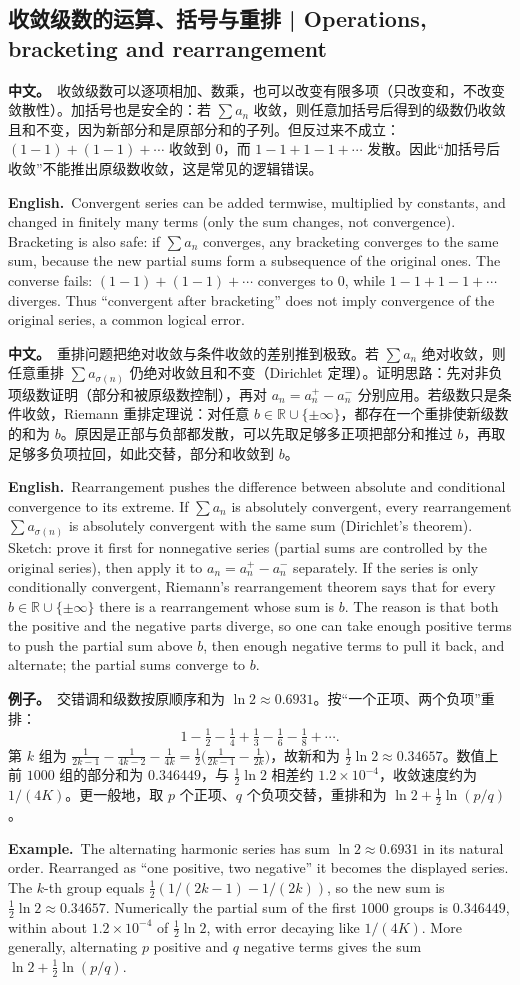 \documentclass[UTF8,11pt,a4paper]{ctexart}
\newcommand{\BOTH}[2]{\par\noindent\textbf{中文。}\ #1\par\noindent\textbf{English.}\ #2\par}
\newcommand{\EX}[2]{\par\noindent\textbf{例子。}\ #1\par\noindent\textbf{Example.}\ #2\par}
\begin{document}
\subsection{收敛级数的运算、括号与重排 | Operations, bracketing and rearrangement}
\BOTH{收敛级数可以逐项相加、数乘，也可以改变有限多项（只改变和，不改变敛散性）。加括号也是安全的：若 $\sum a_n$ 收敛，则任意加括号后得到的级数仍收敛且和不变，因为新部分和是原部分和的子列。但反过来不成立：$(1-1)+(1-1)+\cdots$ 收敛到 $0$，而 $1-1+1-1+\cdots$ 发散。因此“加括号后收敛”不能推出原级数收敛，这是常见的逻辑错误。}{Convergent series can be added termwise, multiplied by constants, and changed in finitely many terms (only the sum changes, not convergence). Bracketing is also safe: if $\sum a_n$ converges, any bracketing converges to the same sum, because the new partial sums form a subsequence of the original ones. The converse fails: $(1-1)+(1-1)+\cdots$ converges to $0$, while $1-1+1-1+\cdots$ diverges. Thus “convergent after bracketing” does not imply convergence of the original series, a common logical error.}
\BOTH{重排问题把绝对收敛与条件收敛的差别推到极致。若 $\sum a_n$ 绝对收敛，则任意重排 $\sum a_{\sigma(n)}$ 仍绝对收敛且和不变（Dirichlet 定理）。证明思路：先对非负项级数证明（部分和被原级数控制），再对 $a_n=a_n^+-a_n^-$ 分别应用。若级数只是条件收敛，Riemann 重排定理说：对任意 $b\in\mathbb R\cup\{\pm\infty\}$，都存在一个重排使新级数的和为 $b$。原因是正部与负部都发散，可以先取足够多正项把部分和推过 $b$，再取足够多负项拉回，如此交替，部分和收敛到 $b$。}{Rearrangement pushes the difference between absolute and conditional convergence to its extreme. If $\sum a_n$ is absolutely convergent, every rearrangement $\sum a_{\sigma(n)}$ is absolutely convergent with the same sum (Dirichlet's theorem). Sketch: prove it first for nonnegative series (partial sums are controlled by the original series), then apply it to $a_n=a_n^+-a_n^-$ separately. If the series is only conditionally convergent, Riemann's rearrangement theorem says that for every $b\in\mathbb R\cup\{\pm\infty\}$ there is a rearrangement whose sum is $b$. The reason is that both the positive and the negative parts diverge, so one can take enough positive terms to push the partial sum above $b$, then enough negative terms to pull it back, and alternate; the partial sums converge to $b$.}
\EX{交错调和级数按原顺序和为 $\ln2\approx0.6931$。按“一个正项、两个负项”重排：
\[
1-\tfrac12-\tfrac14+\tfrac13-\tfrac16-\tfrac18+\cdots .
\]
第 $k$ 组为 $\frac1{2k-1}-\frac1{4k-2}-\frac1{4k}=\frac12\bigl(\frac1{2k-1}-\frac1{2k}\bigr)$，故新和为 $\frac12\ln2\approx0.34657$。数值上前 $1000$ 组的部分和为 $0.346449$，与 $\frac12\ln2$ 相差约 $1.2\times10^{-4}$，收敛速度约为 $1/(4K)$。更一般地，取 $p$ 个正项、$q$ 个负项交替，重排和为 $\ln2+\frac12\ln(p/q)$。}{The alternating harmonic series has sum $\ln2\approx0.6931$ in its natural order. Rearranged as “one positive, two negative” it becomes the displayed series. The $k$-th group equals $\frac12(1/(2k-1)-1/(2k))$, so the new sum is $\frac12\ln2\approx0.34657$. Numerically the partial sum of the first $1000$ groups is $0.346449$, within about $1.2\times10^{-4}$ of $\frac12\ln2$, with error decaying like $1/(4K)$. More generally, alternating $p$ positive and $q$ negative terms gives the sum $\ln2+\frac12\ln(p/q)$.}
\end{document}
